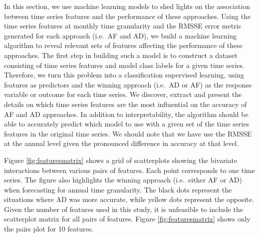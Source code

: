 \documentclass[preprint, 3p,
authoryear]{elsarticle} %
\begin{document}
In this section, we use machine learning models to shed lights on the
association between time series features and the performance of these
approaches. Using the time series features at monthly time granularity
and the RMSSE error metric generated for each approach (i.e.~AF and AD),
we build a machine learning algorithm to reveal relevant sets of
features affecting the performance of these approaches. The first step
in building such a model is to construct a dataset consisting of time
series features and model class labels for a given time series.
Therefore, we turn this problem into a classification supervised
learning, using features as predictors and the winning approach (i.e.~AD
or AF) as the response variable or outcome for each time series. We
discover, extract and present the details on which time series features
are the most influential on the accuracy of AF and AD approaches. In
addition to interpretability, the algorithm should be able to accurately
predict which model to use with a given set of the time series features
in the original time series. We should note that we have use the RMSSE
at the annual level given the pronounced difference in accuracy at that
level.

Figure \ref{fig:featuresmatrix} shows a grid of scatterplots showing the
bivariate interactions between various pairs of features. Each point
corresponds to one time series. The figure also highlights the winning
approach (i.e.~either AF or AD) when forecasting for annual time
granularity. The black dots represent the situations where AD was more
accurate, while yellow dots represent the opposite. Given the number of
features used in this study, it is unfeasible to include the scatterplot
matrix for all pairs of features. Figure \ref{fig:featuresmatrix} shows
only the pairs plot for 10 features.
\end{document}
